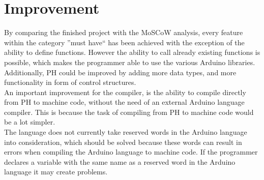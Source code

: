 \section{Improvement}\label{discussion:improvements}
By comparing the finished project with the MoSCoW analysis, every feature within the category ''must have`` has been achieved with the exception of the ability to define functions. However the ability to call already existing functions is possible, which makes the programmer able to use the various Arduino libraries. Additionally, PH could be improved by adding more data types, and more functionality in form of control structures. \\

An important improvement for the compiler, is the ability to compile directly from PH to machine code, without the need of an external Arduino language compiler. This is because the task of compiling from PH to machine code would be a lot simpler.\\

The language does not currently take reserved words in the Arduino language into consideration, which should be solved because these words can result in errors when compiling the Arduino language to machine code. If the programmer declares a variable with the same name as a reserved word in the Arduino language it may create problems. \\ 